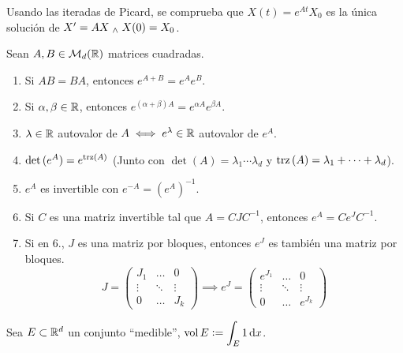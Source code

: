 
\begin{obs}
	Usando las iteradas de Picard, se comprueba que $X(t) = e^{At}X_0$ es la única solución de $X' = AX \; _{\wedge} \; X(0) = X_0$.
\end{obs}

 Sean $A, B \in \mathcal{M}_d(\mathbb{R})$ matrices cuadradas.
\begin{enumerate}
	\item Si $AB = BA$, entonces $e^{A+B} = e^A e^B$.
	\item Si $\alpha, \beta \in \mathbb{R}$, entonces $e^{(\alpha + \beta)A} = e^{\alpha A} e^{\beta A}$.
	\item $\lambda \in \mathbb{R}$ autovalor de $A \iff e^{\lambda} \in \mathbb{R}$ autovalor de $e^A$.
	\item $\det{(e^A)} = e^{\operatorname{trz}\left(A\right)}$ (Junto con $\det(A) = \lambda_1 \cdots \lambda_d$ y $\operatorname{trz}\left(A\right) = \lambda_1 + \cdots + \lambda_d$).
	\item $e^{A}$ es invertible con $e^{-A} = \left(e^A\right)^{-1}$.
	\item Si $C$ es una matriz invertible tal que $A=CJC^{-1}$, entonces $e^A = Ce^JC^{-1}$.
	\item Si en 6., $J$ es una matriz por bloques, entonces $e^J$ es también una matriz por bloques.
	      \[J=\begin{pmatrix}
			      J_1    & \dots  & 0      \\
			      \vdots & \ddots & \vdots \\
			      0      & \dots  & J_k
		      \end{pmatrix} \implies e^J = \begin{pmatrix}
			      e^{J_1} & \dots  & 0       \\
			      \vdots  & \ddots & \vdots  \\
			      0       & \dots  & e^{J_k}
		      \end{pmatrix}\]
\end{enumerate}

\begin{defn}[Volumen]
	Sea $E\subset\mathbb{R}^d$ un conjunto ``medible'', $\ds \vol{E} \defeq \int_{E} 1 \odif{x}$.
\end{defn}

